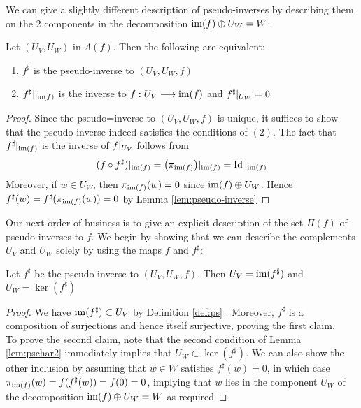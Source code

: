 \documentclass{dsp}
\begin{document}
We can give a slightly different description of pseudo-inverses by describing them on the 2 components in the decomposition $\operatorname{im}(f)\oplus U_W =W$:


\begin{lemma}\label{lem:pschar2}
Let $(U_V,U_W)$ in $\Lambda(f)$. Then the following are equivalent:
\begin{enumerate}
	\item $f^\sharp$ is the pseudo-inverse to $(U_V,U_W,f)$
	\item $f^\sharp\arrowvert_{\operatorname{im}(f)}$ is the inverse to $f:U_V\longrightarrow \operatorname{im}(f)$ and $f^\sharp\arrowvert_{U_W}=0$
\end{enumerate}

\end{lemma}

\begin{proof}
	Since the pseudo=inverse to $(U_V,U_W,f)$ is unique, it suffices to show that the pseudo-inverse indeed satisfies the conditions of $(2)$. The fact that $f^\sharp\arrowvert_{\operatorname{im}(f)}$ is the inverse of $f\arrowvert_{U_V}$ follows from 
	\[
	(f\circ f^\sharp) \arrowvert_{\operatorname{im}(f)}=\big(\pi_{\operatorname{im}(f)}\big)\arrowvert_{\operatorname{im}(f)}=\operatorname{Id}\arrowvert_{\operatorname{im}(f)}
\] 
Moreover, if $w \in U_W$, then $\pi_{\operatorname{im}(f)}(w)=0$ since $\operatorname{im}(f)\oplus U_W$. Hence $f^\sharp(w)=f^\sharp(\pi_{\operatorname{im}(f)}(w))=0$ by Lemma \ref{lem:pseudo-inverse}
\end{proof}
Our next order of business is to give an explicit description of the set $\Pi(f)$ of pseudo-inverses to $f$. We begin by showing that we can describe the complements $U_V$ and $U_W$ solely by using the maps $f$ and $f^\sharp$:
\begin{lemma}\label{lem:psim-ker}
	Let $f^\sharp$ be the pseudo-inverse to $(U_V,U_W,f)$. Then $U_V=\operatorname{im}(f^\sharp)$ and $U_W=\ker(f^\sharp)$
\end{lemma}

\begin{proof}
	We have $\operatorname{im}(f^\sharp)\subset U_V$ by Definition \ref{def:ps} . Moreover, $f^\sharp$ is a composition of surjections and hence itself surjective, proving the first claim.\\
	To prove the second claim, note that the second condition of Lemma \ref{lem:pschar2} immediately implies that $U_W\subset \ker(f^\sharp)$. We can also show the other inclusion by assuming that $w\in W$ satisfies $f^\sharp(w)=0$, in which case $\pi_{\operatorname{im}(f)}(w)=f(f^\sharp(w))=f(0)=0$, implying that $w$ lies in the component $U_W$ of the decomposition $\operatorname{im}(f)\oplus U_W=W$ as required
\end{proof}
\end{document}
